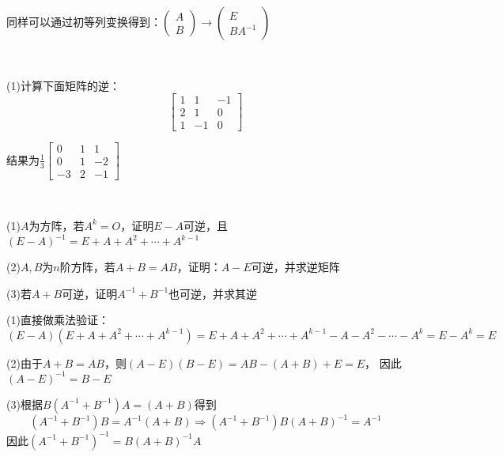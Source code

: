 \begin{note}
  同样可以通过初等列变换得到：$\left(
    \begin{array}{c}
      A\\
      B
    \end{array}
  \right) \rightarrow \left(
    \begin{array}{c}
      E\\
      BA^{-1}
    \end{array}
  \right)$
\end{note}

~

\begin{exercise}[利用初等变换求逆]
  (1)计算下面矩阵的逆：
  \begin{equation*}
    \left[
      \begin{array}{ccc}
        1&1&-1 \\
         2&1&0 \\
         1&-1&0
      \end{array}
    \right]
  \end{equation*}
\end{exercise}

\begin{solution}
  结果为$\frac{1}{3} \left[
    \begin{array}{ccc}
      0&1&1 \\
       0&1&-2 \\
       -3&2&-1
    \end{array}
  \right]$
\end{solution}

~

\begin{exercise}[逆矩阵理论练习]
  (1)$A$为方阵，若$A^k = O$，证明$E - A$可逆，且$(E - A)^{-1} = E + A + A^2 + \cdots + A^{k-1}$

  (2)$A,B$为$n$阶方阵，若$A + B = AB$，证明：$A - E$可逆，并求逆矩阵

  (3)若$A + B$可逆，证明$A^{-1} + B^{-1}$也可逆，并求其逆
\end{exercise}

\begin{solution}
  (1)直接做乘法验证：
  \begin{equation*}
    (E - A)(E + A + A^2 + \cdots + A^{k-1}) = E + A + A^2 + \cdots + A^{k-1} - A - A^2 - \cdots - A^k = E - A^k = E
  \end{equation*}

  (2)由于$A + B = AB$，则$(A-E)(B - E) = AB - (A+B) + E = E$，
  因此$(A-E)^{-1} = B - E$

  (3)根据$B(A^{-1}+B^{-1})A = (A + B)$得到
  \begin{equation*}
    (A^{-1} + B^{-1})B = A^{-1}(A + B) \Rightarrow (A^{-1} + B^{-1})B(A + B)^{-1} = A^{-1}
  \end{equation*}
  因此$(A^{-1} + B^{-1})^{-1} = B(A + B)^{-1}A$
\end{solution}


